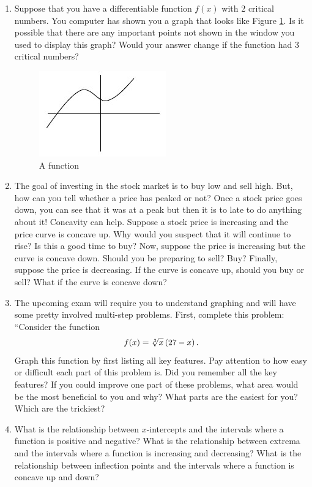 \begin{enumerate}
\item  Suppose that you have a differentiable function $f(x)$ with 2 critical numbers.  You computer has shown you a graph that looks like Figure \ref{Chapter4Figureb}.  Is it possible that there are any important points not shown in the window you used to display this graph?  Would your answer change if the function had 3 critical numbers?  \cite{SM}


\begin{figure}[ht]
	\centering
		\includegraphics{TeXGraphics/Chapter4Figb.jpg}
	\caption{A function}
	\label{Chapter4Figureb}
\end{figure}

\item  The goal of investing in the stock market is to buy low and sell high.  But, how can you tell whether a price has peaked or not?  Once a stock price goes down, you can see that it was at a peak but then it is to late to do anything about it!  Concavity can help.  Suppose a stock price is increasing and the price curve is concave up.  Why would you suspect that it will continue to rise?  Is this a good time to buy?  Now, suppose the price is increasing but the curve is concave down.  Should you be preparing to sell?  Buy?  Finally, suppose the price is decreasing.  If the curve is concave up, should you buy or sell?  What if the curve is concave down?  \cite{SM}

\item  The upcoming exam will require you to understand graphing and will have some pretty involved multi-step problems.  First, complete this problem:  ``Consider the function $$f(x) = \root 3 \of x \left( {27 - x} \right).$$  Graph this function by first listing all key features.  Pay attention to how easy or difficult each part of this problem is.  Did you remember all the key features?  If you could improve one part of these problems, what area would be the most beneficial to you and why?  What parts are the easiest for you?  Which are the trickiest?

\item  What is the relationship between $x$-intercepts and the intervals where a function is positive and negative?  What is the relationship between extrema and the intervals where a function is increasing and decreasing?  What is the relationship between inflection points and the intervals where a function is concave up and down?


\end{enumerate}
